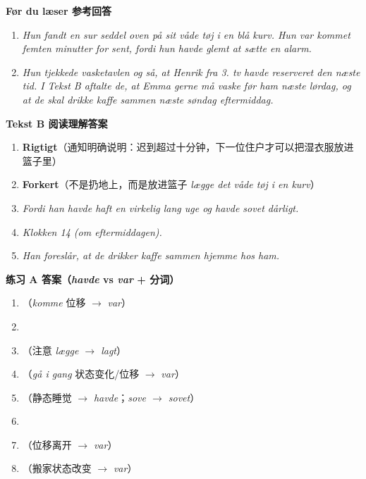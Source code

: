 \begin{answerbox}
\textbf{Før du læser 参考回答}
\begin{enumerate}
  \item \textit{Hun fandt en sur seddel oven på sit våde tøj i en blå kurv. Hun var kommet femten minutter for sent, fordi hun havde glemt at sætte en alarm.}
  \item \textit{Hun tjekkede vasketavlen og så, at Henrik fra 3. tv havde reserveret den næste tid. I Tekst B aftalte de, at Emma gerne må vaske før ham næste lørdag, og at de skal drikke kaffe sammen næste søndag eftermiddag.}
\end{enumerate}

\textbf{Tekst B 阅读理解答案}
\begin{enumerate}
  \item \textbf{Rigtigt}（通知明确说明：迟到超过十分钟，下一位住户才可以把湿衣服放进篮子里）
  \item \textbf{Forkert}（不是扔地上，而是放进篮子 \textit{lægge det våde tøj i en kurv}）
  \item \textit{Fordi han havde haft en virkelig lang uge og havde sovet dårligt.}
  \item \textit{Klokken 14 (om eftermiddagen).}
  \item \textit{Han foreslår, at de drikker kaffe sammen hjemme hos ham.}
\end{enumerate}

\textbf{练习 A 答案（\textit{havde} vs \textit{var} + 分词）}
\begin{enumerate}
  \item {}（\textit{komme} 位移 $\rightarrow$ \textit{var}）
  \item {}
  \item {}（注意 \textit{lægge $\rightarrow$ lagt}）
  \item {}（\textit{gå i gang} 状态变化/位移 $\rightarrow$ \textit{var}）
  \item {}（静态睡觉 $\rightarrow$ \textit{havde}；\textit{sove $\rightarrow$ sovet}）
  \item {}
  \item {}（位移离开 $\rightarrow$ \textit{var}）
  \item {}（搬家状态改变 $\rightarrow$ \textit{var}）
\end{enumerate}


\end{answerbox}
